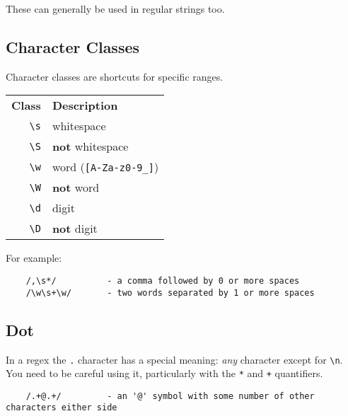 These can generally be used in regular strings too.

\subsection{Character Classes}

Character classes are shortcuts for specific ranges.

\begin{center}
    \begin{small}
        \begin{tabularx}{\textwidth}{r l}
            \textbf{Class}                    & \textbf{Description} \\
            \texttt{\textbackslash s}         & whitespace \\
            \texttt{\textbackslash S}         & \textbf{not} whitespace \\
            \texttt{\textbackslash w}         & word (\texttt{[A-Za-z0-9\_]}) \\
            \texttt{\textbackslash W}         & \textbf{not} word \\
            \texttt{\textbackslash d}         & digit \\
            \texttt{\textbackslash D}         & \textbf{not} digit
        \end{tabularx}
    \end{small}
\end{center}

For example:

\begin{verbatim}
    /,\s*/          - a comma followed by 0 or more spaces
    /\w\s+\w/       - two words separated by 1 or more spaces
\end{verbatim}


\subsection{Dot}

In a regex the \texttt{.} character has a special meaning: \textit{any} character except for \texttt{\textbackslash n}. You need to be careful using it, particularly with the \texttt{*} and \texttt{+} quantifiers.
\\

\begin{verbatim}
    /.+@.+/         - an '@' symbol with some number of other characters either side
\end{verbatim}

